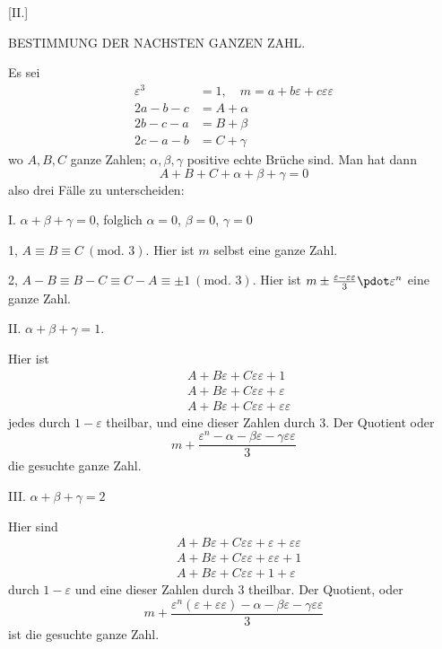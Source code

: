 %

\begin{center}[II.]\par\medskip
BESTIMMUNG DER NACHSTEN GANZEN ZAHL.
\end{center}
Es sei
\[
\begin{aligned}
\varepsilon^3&=1,\quad m=a+b\varepsilon+c\varepsilon\varepsilon\\
2a-b-c&=A+\alpha\\
2b-c-a&=B+\beta\\
2c-a-b&=C+\gamma
\end{aligned}
\]
wo $A,B,C$ ganze Zahlen; $\alpha,\beta,\gamma$ positive echte Brüche sind. Man hat dann
\[
A+B+C+\alpha+\beta+\gamma=0
\]
also drei Fälle zu unterscheiden:

I. $\alpha+\beta+\gamma=0$, folglich $\alpha=0$, $\beta=0$, $\gamma=0$

1, $A\equiv B\equiv C\ (\text{mod. }3)$. Hier ist $m$ selbst eine ganze Zahl.

2, $A-B\equiv B-C\equiv C-A\equiv\pm1\ (\text{mod. }3)$. Hier ist $m\pm\frac{\varepsilon-\varepsilon\varepsilon}{3}\pdot\varepsilon^n$ eine ganze Zahl.

II. $\alpha+\beta+\gamma=1$.

Hier ist
\[
\begin{aligned}
&A+B\varepsilon+C\varepsilon\varepsilon+1\\
&A+B\varepsilon+C\varepsilon\varepsilon+\varepsilon\\
&A+B\varepsilon+C\varepsilon\varepsilon+\varepsilon\varepsilon
\end{aligned}
\]
%
jedes durch $1-\varepsilon$ theilbar, und eine dieser Zahlen durch $3$. Der Quotient oder
\[
m+\frac{\varepsilon^n-\alpha-\beta\varepsilon-\gamma\varepsilon\varepsilon}{3}
\]
die gesuchte ganze Zahl.

III. $\alpha+\beta+\gamma=2$

Hier sind
\[
\begin{aligned}
&A+B\varepsilon+C\varepsilon\varepsilon+\varepsilon+\varepsilon\varepsilon\\
&A+B\varepsilon+C\varepsilon\varepsilon+\varepsilon\varepsilon+1\\
&A+B\varepsilon+C\varepsilon\varepsilon+1+\varepsilon
\end{aligned}
\]
durch $1-\varepsilon$ und eine dieser Zahlen durch $3$ theilbar. Der Quotient, oder
\[
m+\frac{\varepsilon^n(\varepsilon+\varepsilon\varepsilon)-\alpha-\beta\varepsilon-\gamma\varepsilon\varepsilon}{3}
\]
ist die gesuchte ganze Zahl.

